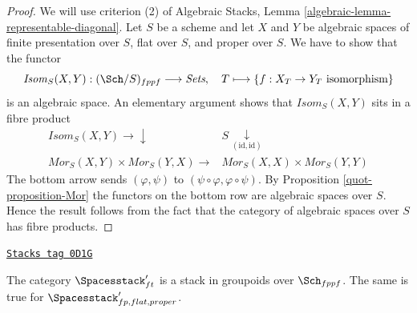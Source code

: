 \begin{proof}

We will use criterion (2) of
Algebraic Stacks, Lemma \ref{algebraic-lemma-representable-diagonal}.
Let $S$ be a scheme and let $X$ and $Y$ be algebraic spaces
of finite presentation over $S$, flat over $S$, and proper over $S$.
We have to show that the functor
$$
\mathit{Isom}_S(X, Y) : (\Sch/S)_{fppf} \longrightarrow \textit{Sets}, \quad
T \longmapsto \{f : X_T \to Y_T \text{ isomorphism}\}
$$
is an algebraic space. An elementary argument shows that
$\mathit{Isom}_S(X, Y)$ sits in a fibre product
$$
\begin{array}{cc}\mathit{Isom}_S(X, Y) \longrightarrow\downarrow & S \underset{(\text{id}, \text{id})}{\downarrow} \\ \mathit{Mor}_S(X, Y) \times \mathit{Mor}_S(Y, X) \longrightarrow & \mathit{Mor}_S(X, X) \times \mathit{Mor}_S(Y, Y)\end{array}
$$
The bottom arrow sends $(\varphi, \psi)$ to
$(\psi \circ \varphi, \varphi \circ \psi)$.
By Proposition \ref{quot-proposition-Mor} the functors on the bottom row
are algebraic spaces over $S$.
Hence the result follows from the fact that the category of
algebraic spaces over $S$ has fibre products.
\end{proof}

\begin{lemma}
\label{quot-lemma-spaces-stack}
\href{https://stacks.math.columbia.edu/tag/0D1G}{\texttt{Stacks tag 0D1G}}

The category $\Spacesstack'_{ft}$ is a stack in groupoids
over $\Sch_{fppf}$. The same is true for
$\Spacesstack'_{fp, flat, proper}$.
\end{lemma}

